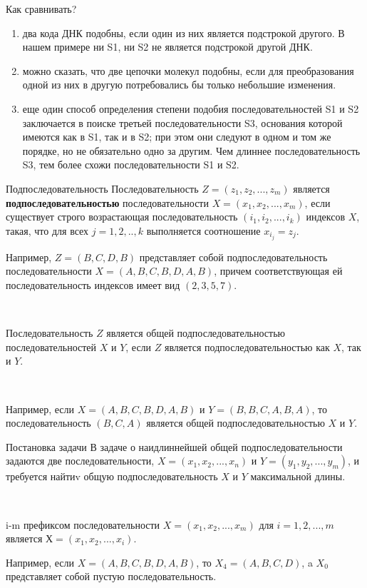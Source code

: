\documentclass{beamer}
\begin{document}
\begin{frame}{Как сравнивать?}
    \begin{enumerate}
        \item два кода ДНК подобны, если один из них является подстрокой другого. В нашем примере ни S1, ни S2 не является подстрокой другой ДНК. 
        \item можно сказать, что две цепочки молекул подобны, если для преобразования одной из них в другую потребовались бы только небольшие изменения. \item еще один способ определения степени подобия последовательностей S1 и S2 заключается в поиске третьей последовательности S3, основания которой имеются как в S1, так и в S2; при этом они следуют в одном и том же порядке, но не обязательно одно за другим. Чем длиннее последовательность S3, тем более схожи последовательности S1 и S2.
    \end{enumerate}
\end{frame}

\begin{frame}
    \begin{block}{Подпоследовательность}
    Последовательность $Z=(z_1, z_2,...,z_m)$ является \textbf{подпоследовательностью} последовательности $X=(x_1, x_2,..., x_m)$, если существует строго возрастающая последовательность $(i_1, i_2,...,  i_k)$ индексов $X$, такая, что для всех $j=1,2,..,k$  выполняется соотношение $x_{i_j} = z_j$.
    \end{block}
     
    Например, $Z=(B,C,D,B)$ представляет собой подпоследовательность последовательности $X=(A,B,C,B,D,A,B)$, причем соответствующая ей последовательность индексов имеет вид $(2,3,5,7)$.

    ~
    
    Последовательность $Z$ является общей подпоследовательностью последовательностей $X$ и $Y$, если $Z$ является подпоследовательностью как $X$, так и $Y$. 
    
    ~
    
    Например, если $X=(A,B,C,B,D,A,B)$ и $Y=(B,B,C,A,B,A)$, то последовательность $(B,C,A)$ является общей подпоследовательностью $X$ и $Y$.
\end{frame}

\begin{frame}{Постановка задачи}
    В задаче о наидлиннейшей общей подпоследовательности задаются две последовательности, $X=(x_1, x_2,...,x_n)$ и $Y=(y_1,y_2,...,y_m)$,  и требуется найтиv общую подпоследовательность $X$ и $Y$ максимальной длины.
    
    ~
    
    \begin{block}{i-m префиксом последовательности}
        $X=(x_1, x_2,...,x_m)$ для $i=1,2,...,m$ является $Х=(x_1,x_2,...,x_i)$.
    \end{block}
    
    Например, если $X=(A,B,C,B,D,A,B)$, то $X_4 = (A,B,C,D)$, a $X_0$ представляет собой пустую последовательность.
\end{frame}
\end{document}
